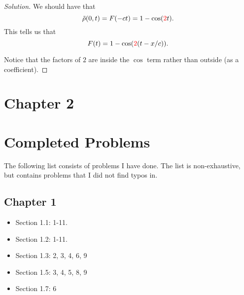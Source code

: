 \documentclass[11pt]{article}
\newenvironment{solution}
  {\renewcommand\qedsymbol{$\blacksquare$}\begin{proof}[Solution]}
  {\end{proof}}
\begin{document}
\begin{solution}
We should have that \[\tilde{\rho}(0,t) = F(-ct) = 1- \cos(\textcolor{red}{2}t).\] This tells us that \[F(t) = 1-\cos(\textcolor{red}{2}(t - x/c)). \]

Notice that the factors of $2$ are inside the $\cos$ term rather than outside (as a coefficient).
\end{solution}

\section{Chapter 2}

\appendix

\newpage

\section{Completed Problems}

The following list consists of problems I have done. The list is non-exhaustive, but contains problems that I did not find typos in.
\subsection{Chapter 1}
\begin{itemize}
  \item Section 1.1: 1-11.
  \item Section 1.2: 1-11.
  \item Section 1.3: 2, 3, 4, 6, 9
  \item Section 1.5: 3, 4, 5, 8, 9
  \item Section 1.7: 6
\end{itemize}
\end{document}
